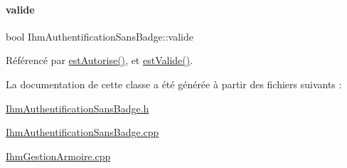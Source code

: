 \paragraph{\texorpdfstring{valide}{valide}}
{\footnotesize\ttfamily bool Ihm\+Authentification\+Sans\+Badge\+::valide\hspace{0.3cm}{\ttfamily [private]}}



Référencé par \hyperlink{class_ihm_authentification_sans_badge_a17b178accdfe141a7e27fa1888bebcbc}{est\+Autorise()}, et \hyperlink{class_ihm_authentification_sans_badge_a676cfdbf93ef79fb7c4c47fdd8d0fb43}{est\+Valide()}.



La documentation de cette classe a été générée à partir des fichiers suivants \+:\begin{DoxyCompactItemize}
\item 
\hyperlink{_ihm_authentification_sans_badge_8h}{Ihm\+Authentification\+Sans\+Badge.\+h}\item 
\hyperlink{_ihm_authentification_sans_badge_8cpp}{Ihm\+Authentification\+Sans\+Badge.\+cpp}\item 
\hyperlink{_ihm_gestion_armoire_8cpp}{Ihm\+Gestion\+Armoire.\+cpp}\end{DoxyCompactItemize}

